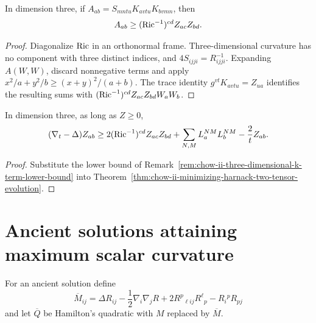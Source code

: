 \begin{remark}
\label{rem:chow-ii-three-dimensional-k-term-lower-bound}

In dimension three, if
\(A_{ab}=S_{mntu}K_{avtu}K_{bvmn}\), then
\[
A_{ab}\ge(\operatorname{Ric}^{-1})^{cd}Z_{ac}Z_{bd}.
\]
\end{remark}
\begin{proof}
\sketch Diagonalize \(\operatorname{Ric}\) in an orthonormal frame.  Three-dimensional curvature
has no component with three distinct indices, and
\(4S_{ijji}=R_{ijji}^{-1}\).  Expanding \(A(W,W)\), discard nonnegative
terms and apply
\(x^2/a+y^2/b\ge(x+y)^2/(a+b)\).  The trace identity
\(g^{vt}K_{avtu}=Z_{ua}\) identifies the resulting sums with
\((\operatorname{Ric}^{-1})^{cd}Z_{ac}Z_{bd}W_aW_b\).
\end{proof}

\begin{corollary}
\label{cor:chow-ii-three-dimensional-z-quadratic-evolution-bound}


In dimension three, as long as \(Z\ge0\),
\[
(\nabla_t-\Delta)Z_{ab}\ge
2(\operatorname{Ric}^{-1})^{cd}Z_{ac}Z_{bd}
+\sum_{N,M}L_a^{NM}L_b^{NM}-\frac2tZ_{ab}.
\]
\end{corollary}
\begin{proof}
\sketch Substitute the lower bound of
Remark~\ref{rem:chow-ii-three-dimensional-k-term-lower-bound} into
Theorem~\ref{thm:chow-ii-minimizing-harnack-two-tensor-evolution}.
\end{proof}

\section{Ancient solutions attaining maximum scalar curvature}

For an ancient solution define
\[
\overline M_{ij}=\Delta R_{ij}-\frac12\nabla_i\nabla_jR
+2R^p{}_{\ell ij}R^\ell{}_p-R_i{}^pR_{pj}
\]
and let \(\overline Q\) be Hamilton's quadratic with \(M\) replaced by
\(\overline M\).


